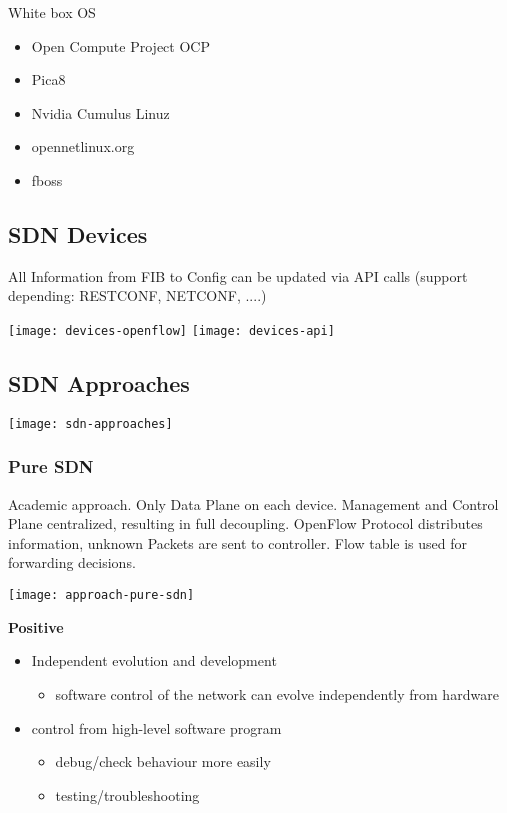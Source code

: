 \noindent
White box OS
\begin{itemize}
	\item Open Compute Project OCP
	\item Pica8
	\item Nvidia Cumulus Linuz
	\item opennetlinux.org
	\item fboss
\end{itemize}

\subsection{SDN Devices}
All Information from FIB to Config can be updated via API calls (support depending: RESTCONF, NETCONF, ....)

\texttt{[image: devices-openflow]}
\texttt{[image: devices-api]}

\subsection{SDN Approaches}

\texttt{[image: sdn-approaches]}

\subsubsection{Pure SDN}
Academic approach.
Only Data Plane on each device. 
Management and Control Plane centralized, resulting in full decoupling. 
OpenFlow Protocol distributes information, unknown Packets are sent to controller. 
Flow table is used for forwarding decisions. 

\texttt{[image: approach-pure-sdn]}

\noindent
\textbf{Positive}
\begin{itemize}
	\item Independent evolution and development 
	\begin{itemize}\item software control of the network can evolve independently from hardware \end{itemize}
	\item control from high-level software program 
	\begin{itemize}\item debug/check behaviour more easily 
	\item testing/troubleshooting\end{itemize} 
\end{itemize}

